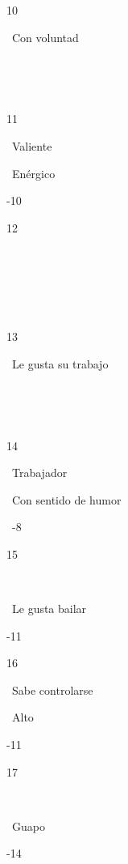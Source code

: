 10

~Con voluntad

~

~

11

~Valiente

~Enérgico

-10

12

~

~

~

13

~Le gusta su trabajo

~

~

14

~Trabajador

~Con sentido de humor

~-8

15

~

~Le gusta bailar

-11

16

~Sabe controlarse

~Alto

-11

17

~

~Guapo

-14

